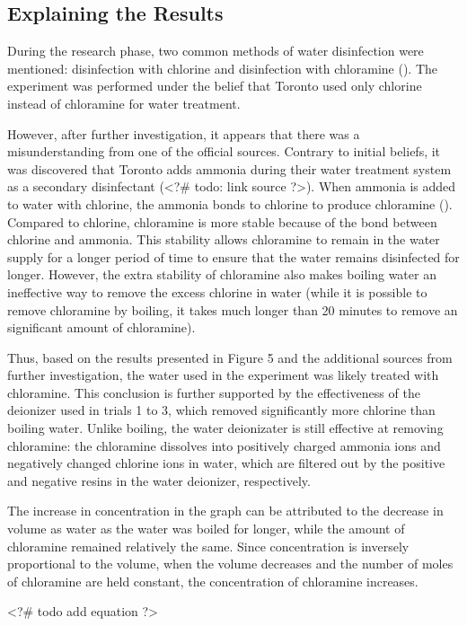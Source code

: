 \documentclass[11pt]{article}
\begin{document}
\subsection{Explaining the Results}

During the research phase, two common methods of water disinfection were mentioned: disinfection with chlorine and disinfection with chloramine (). The experiment was performed under the belief that Toronto used only chlorine instead of chloramine for water treatment.

However, after further investigation, it appears that there was a misunderstanding from one of the official sources. Contrary to initial beliefs, it was discovered that Toronto adds ammonia during their water treatment system as a secondary disinfectant (<?# todo: link source ?>). When ammonia is added to water with chlorine, the ammonia bonds to chlorine to produce chloramine (). Compared to chlorine, chloramine is more stable because of the bond between chlorine and ammonia. This stability allows chloramine to remain in the water supply for a longer period of time to ensure that the water remains disinfected for longer. However, the extra stability of chloramine also makes boiling water an ineffective way to remove the excess chlorine in water (while it is possible to remove chloramine by boiling, it takes much longer than 20 minutes to remove an significant amount of chloramine).

Thus, based on the results presented in Figure 5 and the additional sources from further investigation, the water used in the experiment was likely treated with chloramine. This conclusion is further supported by the effectiveness of the deionizer used in trials 1 to 3, which removed significantly more chlorine than boiling water. Unlike boiling, the water deionizater is still effective at removing chloramine: the chloramine dissolves into positively charged ammonia ions and negatively changed chlorine ions in water, which are filtered out by the positive and negative resins in the water deionizer, respectively.

The increase in concentration in the graph can be attributed to the decrease in volume as water as the water was boiled for longer, while the amount of chloramine remained relatively the same. Since concentration is inversely proportional to the volume, when the volume decreases and the number of moles of chloramine are held constant, the concentration of chloramine increases.

<?# todo add equation ?>
\end{document}
